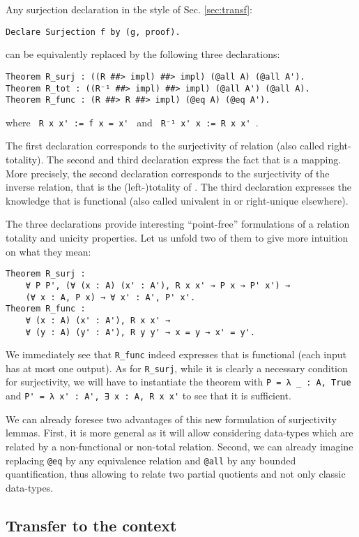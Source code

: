 \documentclass{llncs}
\begin{document}
Any surjection declaration in the style of Sec. \ref{sec:transf}:
\begin{verbatim}Declare Surjection f by (g, proof).\end{verbatim}
can be equivalently replaced by the following three declarations:
\begin{verbatim}Theorem R_surj : ((R ##> impl) ##> impl) (@all A) (@all A').
Theorem R_tot : ((R⁻¹ ##> impl) ##> impl) (@all A') (@all A).
Theorem R_func : (R ##> R ##> impl) (@eq A) (@eq A').\end{verbatim}
where \verb| R x x' := f x = x' | and \verb| R⁻¹ x' x := R x x' |.

The first declaration corresponds to the surjectivity of relation 
(also called right-totality).
The second and third declaration express the fact that  is a mapping.
More precisely, the second declaration corresponds to the surjectivity of the inverse
relation, that is the (left-)totality of .
The third declaration expresses the knowledge that  is functional
(also called univalent in \cite[Ch. 5.1]{schmidt2011relational} or right-unique
elsewhere).

The three declarations provide interesting ``point-free'' formulations
of a relation totality and unicity properties. Let us unfold two of
them to give more intuition on what they mean:

\begin{verbatim}
Theorem R_surj :
    ∀ P P', (∀ (x : A) (x' : A'), R x x' → P x → P' x') →
    (∀ x : A, P x) → ∀ x' : A', P' x'.
Theorem R_func :
    ∀ (x : A) (x' : A'), R x x' →
    ∀ (y : A) (y' : A'), R y y' → x = y → x' = y'.\end{verbatim}
We immediately see that \verb|R_func| indeed expresses that  is
functional (each input has at most one output).
As for \verb|R_surj|, while it is clearly a necessary
condition for surjectivity,
we will have to instantiate the
theorem with \verb|P = λ _ : A, True| and \verb|P' = λ x' : A', ∃ x : A, R x x'|
to see that it is sufficient.


We can already foresee two advantages of this new formulation of
surjectivity lemmas. First, it is more general as it will allow
considering data-types which are related by a non-functional or
non-total relation.
Second, we can already imagine replacing \verb|@eq| by any equivalence
relation and \verb|@all| by any bounded quantification, thus allowing
to relate two partial quotients and not only classic data-types.

\subsection{Transfer to the context}
\end{document}
